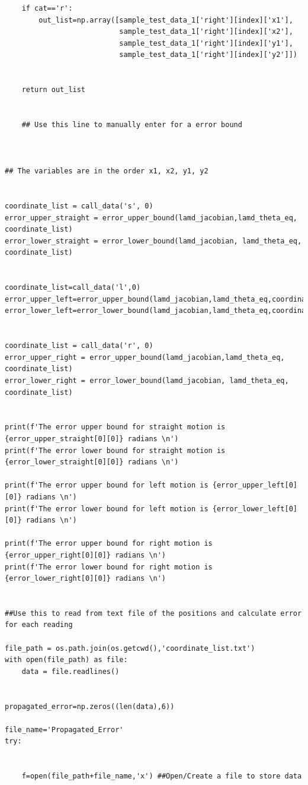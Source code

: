 {\begin{itemize}
\begin{verbatim}
    if cat=='r':
        out_list=np.array([sample_test_data_1['right'][index]['x1'],
                           sample_test_data_1['right'][index]['x2'],
                           sample_test_data_1['right'][index]['y1'],
                           sample_test_data_1['right'][index]['y2']])
    
    
    return out_list
    
    
    ## Use this line to manually enter for a error bound



## The variables are in the order x1, x2, y1, y2


coordinate_list = call_data('s', 0)
error_upper_straight = error_upper_bound(lamd_jacobian,lamd_theta_eq, coordinate_list)
error_lower_straight = error_lower_bound(lamd_jacobian, lamd_theta_eq, coordinate_list)


coordinate_list=call_data('l',0)
error_upper_left=error_upper_bound(lamd_jacobian,lamd_theta_eq,coordinate_list)
error_lower_left=error_lower_bound(lamd_jacobian,lamd_theta_eq,coordinate_list)


coordinate_list = call_data('r', 0)
error_upper_right = error_upper_bound(lamd_jacobian,lamd_theta_eq, coordinate_list)
error_lower_right = error_lower_bound(lamd_jacobian, lamd_theta_eq, coordinate_list)


print(f'The error upper bound for straight motion is {error_upper_straight[0][0]} radians \n')
print(f'The error lower bound for straight motion is {error_lower_straight[0][0]} radians \n')

print(f'The error upper bound for left motion is {error_upper_left[0][0]} radians \n')
print(f'The error lower bound for left motion is {error_lower_left[0][0]} radians \n')

print(f'The error upper bound for right motion is {error_upper_right[0][0]} radians \n')
print(f'The error lower bound for right motion is {error_lower_right[0][0]} radians \n')


##Use this to read from text file of the positions and calculate error for each reading

file_path = os.path.join(os.getcwd(),'coordinate_list.txt')
with open(file_path) as file:
    data = file.readlines()


propagated_error=np.zeros((len(data),6))

file_name='Propagated_Error'
try:


    f=open(file_path+file_name,'x') ##Open/Create a file to store data



\end{verbatim}
\end{itemize}}
